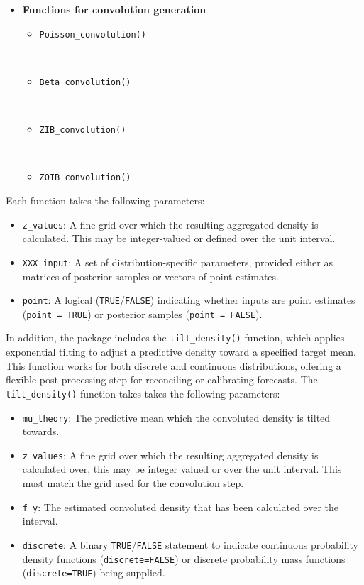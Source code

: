 \begin{itemize}
\tightlist
\item
  \textbf{Functions for convolution generation}

  \begin{itemize}
  \tightlist
  \item
    \texttt{Poisson\_convolution()}\strut \\
  \item
    \texttt{Beta\_convolution()}\strut \\
  \item
    \texttt{ZIB\_convolution()}\strut \\
  \item
    \texttt{ZOIB\_convolution()}
  \end{itemize}
\end{itemize}

Each function takes the following parameters:

\begin{itemize}
\tightlist
\item
  \texttt{z\_values}: A fine grid over which the resulting aggregated density is calculated. This may be integer-valued or defined over the unit interval.\\
\item
  \texttt{XXX\_input}: A set of distribution-specific parameters, provided either as matrices of posterior samples or vectors of point estimates.\\
\item
  \texttt{point}: A logical (\texttt{TRUE}/\texttt{FALSE}) indicating whether inputs are point estimates (\texttt{point\ =\ TRUE}) or posterior samples (\texttt{point\ =\ FALSE}).
\end{itemize}

In addition, the package includes the \texttt{tilt\_density()} function, which applies exponential tilting to adjust a predictive density toward a specified target mean. This function works for both discrete and continuous distributions, offering a flexible post-processing step for reconciling or calibrating forecasts. The \texttt{tilt\_density()} function takes takes the following parameters:

\begin{itemize}
\tightlist
\item
  \texttt{mu\_theory}: The predictive mean which the convoluted density is tilted towards.
\item
  \texttt{z\_values}: A fine grid over which the resulting aggregated density is calculated over, this may be integer valued or over the unit interval. This must match the grid used for the convolution step.
\item
  \texttt{f\_y}: The estimated convoluted density that has been calculated over the interval.
\item
  \texttt{discrete}: A binary \texttt{TRUE}/\texttt{FALSE} statement to indicate continuous probability density functions (\texttt{discrete=FALSE}) or discrete probability mass functions (\texttt{discrete=TRUE}) being supplied.
\end{itemize}

